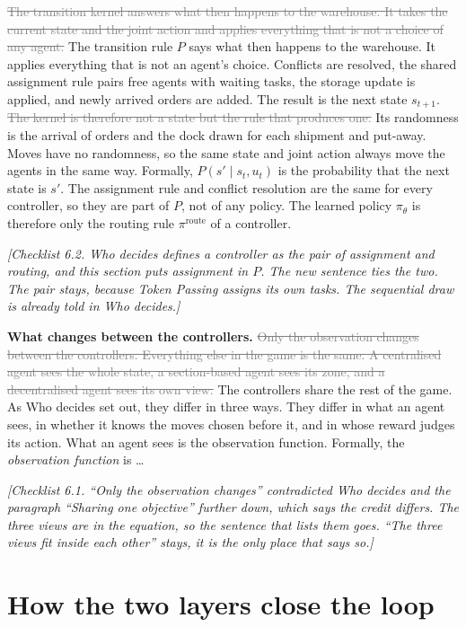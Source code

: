 \documentclass[11pt,a4paper]{article}
\newcommand{\new}[1]{\textcolor{newc}{#1}}
\newcommand{\old}[1]{\textcolor{gray}{\sout{#1}}}
\newcommand{\note}[1]{{\small\itshape [#1]}}
\begin{document}
\old{The transition kernel answers what then happens to the warehouse. It
takes the current state and the joint action and applies everything that is
not a choice of any agent.} \new{The transition rule $P$ says what then
happens to the warehouse. It applies everything that is not an agent's
choice.} Conflicts are resolved, the shared assignment rule pairs free agents
with waiting tasks, the storage update is applied, and newly arrived orders
are added. The result is the next state $s_{t+1}$. \old{The kernel is
therefore not a state but the rule that produces one.} Its randomness is the
arrival of orders and the dock drawn for each shipment and put-away. Moves
have no randomness, so the same state and joint action always move the
agents in the same way. Formally, $P(s' \mid s_t, u_t)$ is the probability
that the next state is $s'$. The assignment rule and conflict resolution are
the same for every controller, so they are part of $P$, not of any policy.
\new{The learned policy $\pi_\theta$ is therefore only the routing rule
$\pi^{\mathrm{route}}$ of a controller.}

\note{Checklist 6.2. Who decides defines a controller as the pair of
assignment and routing, and this section puts assignment in $P$. The new
sentence ties the two. The pair stays, because Token Passing assigns its own
tasks. The sequential draw is already told in Who decides.}

\textbf{What changes between the controllers.}
\old{Only the observation changes between the controllers. Everything else in
the game is the same. A centralised agent sees the whole state, a
section-based agent sees its zone, and a decentralised agent sees its own
view.} \new{The controllers share the rest of the game. As Who decides set
out, they differ in three ways. They differ in what an agent sees, in
whether it knows the moves chosen before it, and in whose reward judges its
action. What an agent sees is the observation function.} Formally, the
\emph{observation function} is \dots

\note{Checklist 6.1. ``Only the observation changes'' contradicted Who
decides and the paragraph ``Sharing one objective'' further down, which
says the credit differs. The three views are in the equation, so the
sentence that lists them goes. ``The three views fit inside each other''
stays, it is the only place that says so.}

\section*{How the two layers close the loop}
\end{document}

